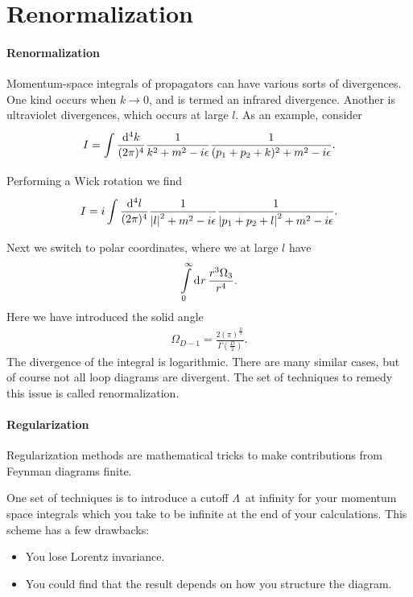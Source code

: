 \section{Renormalization}

\paragraph{Renormalization}
Momentum-space integrals of propagators can have various sorts of divergences. One kind occurs when $k\to 0$, and is termed an infrared divergence. Another is ultraviolet divergences, which occurs at large $l$. As an example, consider
\begin{align*}
	I = \int\limits_{}^{}\frac{\dd[4]{k}}{(2\pi)^{4}}\frac{1}{k^{2} + m^{2} - i\epsilon}\frac{1}{(p_{1} + p_{2} + k)^{2} + m^{2} - i\epsilon}.
\end{align*}
Performing a Wick rotation  we find
\begin{align*}
	I = i\int\limits_{}^{}\frac{\dd[4]{l}}{(2\pi)^{4}}\frac{1}{\abs{l}^{2} + m^{2} - i\epsilon}\frac{1}{\abs{p_{1} + p_{2} + l}^{2} + m^{2} - i\epsilon}.
\end{align*}
Next we switch to polar coordinates, where we at large $l$ have
\begin{align*}
	\int\limits_{0}^{\infty}\dd[]{r}\frac{r^{3}\Omega_{3}}{r^{4}}.
\end{align*}
Here we have introduced the solid angle
\begin{align*}
	\Omega_{D - 1} = \frac{2(\pi)^{\frac{D}{2}}}{\Gamma\left(\frac{D}{2}\right)}.
\end{align*}
The divergence of the integral is logarithmic. There are many similar cases, but of course not all loop diagrams are divergent. The set of techniques to remedy this issue is called renormalization.

\paragraph{Regularization}
Regularization methods are mathematical tricks to make contributions from Feynman diagrams finite.

One set of techniques is to introduce a cutoff $\Lambda$ at infinity for your momentum space integrals which you take to be infinite at the end of your calculations. This scheme has a few drawbacks:
\begin{itemize}
	\item You lose Lorentz invariance.
	\item You could find that the result depends on how you structure the diagram.
\end{itemize}

